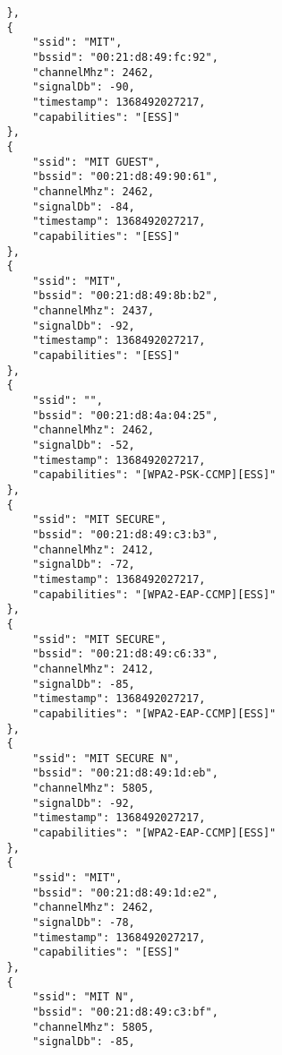 \begin{verbatim}
                },
                {
                    "ssid": "MIT",
                    "bssid": "00:21:d8:49:fc:92",
                    "channelMhz": 2462,
                    "signalDb": -90,
                    "timestamp": 1368492027217,
                    "capabilities": "[ESS]"
                },
                {
                    "ssid": "MIT GUEST",
                    "bssid": "00:21:d8:49:90:61",
                    "channelMhz": 2462,
                    "signalDb": -84,
                    "timestamp": 1368492027217,
                    "capabilities": "[ESS]"
                },
                {
                    "ssid": "MIT",
                    "bssid": "00:21:d8:49:8b:b2",
                    "channelMhz": 2437,
                    "signalDb": -92,
                    "timestamp": 1368492027217,
                    "capabilities": "[ESS]"
                },
                {
                    "ssid": "",
                    "bssid": "00:21:d8:4a:04:25",
                    "channelMhz": 2462,
                    "signalDb": -52,
                    "timestamp": 1368492027217,
                    "capabilities": "[WPA2-PSK-CCMP][ESS]"
                },
                {
                    "ssid": "MIT SECURE",
                    "bssid": "00:21:d8:49:c3:b3",
                    "channelMhz": 2412,
                    "signalDb": -72,
                    "timestamp": 1368492027217,
                    "capabilities": "[WPA2-EAP-CCMP][ESS]"
                },
                {
                    "ssid": "MIT SECURE",
                    "bssid": "00:21:d8:49:c6:33",
                    "channelMhz": 2412,
                    "signalDb": -85,
                    "timestamp": 1368492027217,
                    "capabilities": "[WPA2-EAP-CCMP][ESS]"
                },
                {
                    "ssid": "MIT SECURE N",
                    "bssid": "00:21:d8:49:1d:eb",
                    "channelMhz": 5805,
                    "signalDb": -92,
                    "timestamp": 1368492027217,
                    "capabilities": "[WPA2-EAP-CCMP][ESS]"
                },
                {
                    "ssid": "MIT",
                    "bssid": "00:21:d8:49:1d:e2",
                    "channelMhz": 2462,
                    "signalDb": -78,
                    "timestamp": 1368492027217,
                    "capabilities": "[ESS]"
                },
                {
                    "ssid": "MIT N",
                    "bssid": "00:21:d8:49:c3:bf",
                    "channelMhz": 5805,
                    "signalDb": -85,

\end{verbatim}
